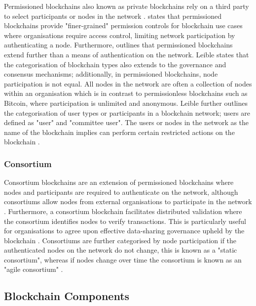 Permissioned blockchains also known as private blockchains rely on a third party to select participants or nodes in the network \autocite{imteajIntroductionBlockchainTechnology2021}.\autocite{yagaBlockchainTechnologyOverview2018} states that permissioned blockchains provide "finer-grained" permission controls for blockchain use cases where organisations require access control, limiting network participation by authenticating a node. Furthermore, \autocite{leibleReviewBlockchainTechnology2019} outlines that permissioned blockchains extend further than a means of authentication on the network. Leible states that the categorisation of blockchain types also extends to the governance and consensus mechanisms; additionally, in permissioned blockchains, node participation is not equal. All nodes in the network are often a collection of nodes within an organisation which is in contrast to permissionless blockchains such as Bitcoin, where participation is unlimited and anonymous. Leible further outlines the categorisation of user types or participants in a blockchain network; users are defined as "user" and "committee user". The users or nodes in the network as the name of the blockchain implies can perform certain restricted actions on the blockchain \autocite{butijnBlockchainsSystematicMultivocal2020} \autocite{rajasekaranComprehensiveSurveyBlockchain2022}.

\subsubsection{Consortium}

Consortium blockchains are an extension of permissioned blockchains where nodes and participants are required to authenticate on the network, although consortiums allow nodes from external organisations to participate in the network \autocite{butijnBlockchainsSystematicMultivocal2020}. Furthermore, a consortium blockchain facilitates distributed validation where the consortium identifies nodes to verify transactions. This is particularly useful for organisations to agree upon effective data-sharing governance upheld by the blockchain \autocite{imteajIntroductionBlockchainTechnology2021}. Consortiums are further categorised by node participation if the authenticated nodes on the network do not change, this is known as a "static consortium", whereas if nodes change over time the consortium is known as an "agile consortium" \autocite{ruotiBlockchainTechnologyWhat2019}. 

\subsection{Blockchain Components}

